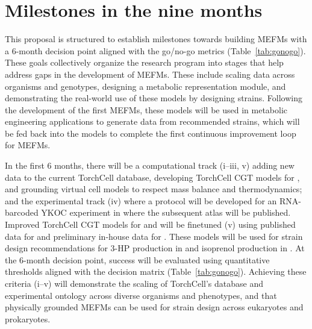
\section{Milestones in the nine months}\label{sec:milestones}

This proposal is structured to establish milestones towards building MEFMs with a
6-month decision point aligned with the go/no-go metrics
(Table~\ref{tab:gonogo}). These goals collectively organize the research program
into stages that help address gaps in the development of MEFMs. These include
scaling data across organisms and genotypes, designing a metabolic representation
module, and demonstrating the real-world use of these models by designing strains.
Following the development of the first MEFMs, these models will be used in
metabolic engineering applications to generate data from recommended strains, which
will be fed back into the models to complete the first continuous improvement loop
for MEFMs.

In the first 6 months, there will be a computational track (i--iii, v) adding new
data to the current TorchCell database, developing TorchCell CGT models for
, and grounding virtual cell models to respect mass balance and
thermodynamics; and the experimental track (iv) where a protocol will be developed
for an RNA-barcoded YKOC experiment in  where the subsequent
atlas will be published. Improved TorchCell CGT models for  and
 will be finetuned (v) using published data for  and
preliminary in-house data for . These models will be used for
strain design recommendations for 3-HP production in  and
isoprenol production in . At the 6-month decision point, success
will be evaluated using quantitative thresholds aligned with the decision matrix
(Table~\ref{tab:gonogo}). Achieving these criteria (i--v) will demonstrate the
scaling of TorchCell's database and experimental ontology across diverse organisms
and phenotypes, and that physically grounded MEFMs can be used for strain design
across eukaryotes and prokaryotes.

